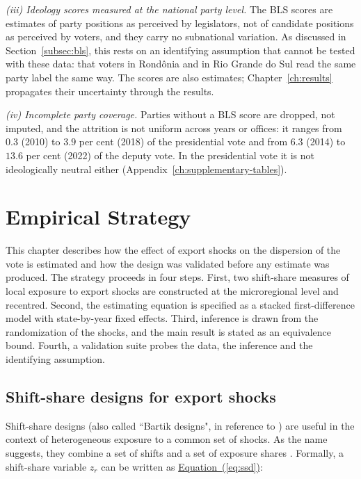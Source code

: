 \documentclass[
	11pt,				%
	oneside,			%
	a4paper,			%
	english,			%
	english				%
	]{abntex2ppgsi}
\theoremstyle{plain}
\theoremstyle{remark}
\theoremstyle{plain}%
\theoremstyle{remark}%
\begin{document}
\textit{(iii) Ideology scores measured at the national party level.} The BLS scores are estimates of party positions as perceived by legislators, not of candidate positions as perceived by voters, and they carry no subnational variation. As discussed in Section~\ref{subsec:bls}, this rests on an identifying assumption that cannot be tested with these data: that voters in Rondônia and in Rio Grande do Sul read the same party label the same way. The scores are also estimates; Chapter~\ref{ch:results} propagates their uncertainty through the results.

\textit{(iv) Incomplete party coverage.} Parties without a BLS score are dropped, not imputed, and the attrition is not uniform across years or offices: it ranges from $0.3$ (2010) to $3.9$ per cent (2018) of the presidential vote and from $6.3$ (2014) to $13.6$ per cent (2022) of the deputy vote. In the presidential vote it is not ideologically neutral either (Appendix~\ref{ch:supplementary-tables}).
\chapter{Empirical Strategy}
\label{ch:empirical-strategy}

This chapter describes how the effect of export shocks on the dispersion of the vote is estimated and how the design was validated before any estimate was produced. The strategy proceeds in four steps. First, two shift-share measures of local exposure to export shocks are constructed at the microregional level and recentred. Second, the estimating equation is specified as a stacked first-difference model with state-by-year fixed effects. Third, inference is drawn from the randomization of the shocks, and the main result is stated as an equivalence bound. Fourth, a validation suite probes the data, the inference and the identifying assumption.

\section{Shift-share designs for export shocks}

Shift-share designs (also called ``Bartik designs", in reference to ) are useful in the context of heterogeneous exposure to a common set of shocks. As the name suggests, they combine a set of shifts and a set of exposure shares \cite{shift}. Formally, a shift-share variable \(z_r\) can be written as \hyperref[eq:ssd]{Equation~(\ref{eq:ssd})}:
\end{document}
